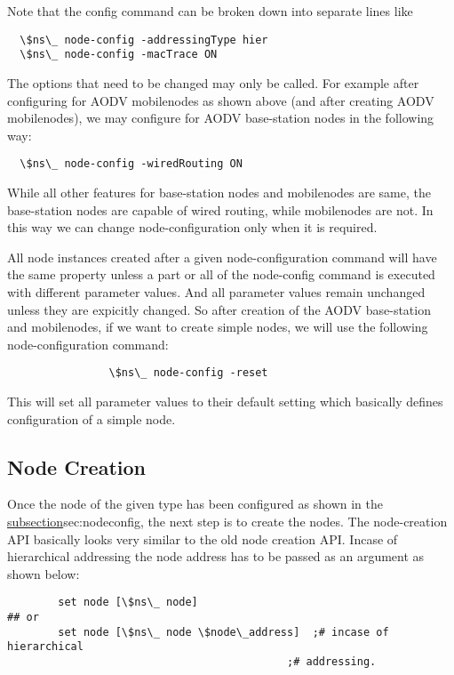 Note that the config command can be broken down into separate lines like
\begin{verbatim}
  \$ns\_ node-config -addressingType hier
  \$ns\_ node-config -macTrace ON
\end{verbatim}

The options that need to be changed may only be called. For example after
configuring for AODV mobilenodes as shown above (and after creating AODV
mobilenodes), we may configure for AODV base-station nodes in the
following way: 

\begin{verbatim}
  \$ns\_ node-config -wiredRouting ON
\end{verbatim}

While all other features for base-station nodes and mobilenodes are same,
the base-station nodes are capable of wired routing, while mobilenodes are
not. In this way we can change node-configuration only when it is required.

All node instances created after a given node-configuration command will
have the same property unless a part or all of the node-config command is
executed with different parameter values. And all parameter values remain
unchanged unless they are expicitly changed. So after creation of the AODV
base-station and mobilenodes, if we want to create simple nodes, we will
use the following node-configuration command:

\begin{verbatim}
                \$ns\_ node-config -reset
\end{verbatim}

This will set all parameter values to their default setting which
basically defines configuration of a simple node.


\subsection{Node Creation}
\label{sec:node-creation}

Once the node of the given type has been configured as shown in the
\href{previous subsection}{subsection}{sec:nodeconfig}, the next step is
to create the nodes. The node-creation API basically looks very similar
to the old node creation API. Incase of hierarchical addressing the node 
address has to be passed as an argument as shown below:

\begin{verbatim}
        set node [\$ns\_ node] 
## or
        set node [\$ns\_ node \$node\_address]  ;# incase of hierarchical
                                            ;# addressing.
\end{verbatim}

